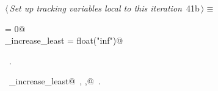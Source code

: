 \documentclass[11.5pt]{report}
\begin{document}
\begin{flushleft} \small\label{scrap57}\raggedright\small
{} $\langle\,${\itshape Set up tracking variables local to this iteration}\nobreak\ {\footnotesize {41b}}$\,\rangle\equiv$
\vspace{-1ex}
\begin{list}{}{} \item
\mbox{}\verb@ibest                = 0@\\
\mbox{}\verb@delta_increase_least = float("inf")@\\
\mbox{}\verb@@{\NWsep}
\end{list}
\vspace{-1.5ex}
\footnotesize
\begin{list}{}{\setlength{\itemsep}{-\parsep}\setlength{\itemindent}{-\leftmargin}}
\item \NWtxtMacroRefIn\ .
\item \NWtxtIdentsDefed\nobreak\  \verb@delta_increase_least@\nobreak\ , \verb@ibest,@\nobreak\ .
\item{}
\end{list}
\vspace{4ex}
\end{flushleft}

\vspace{-0.8cm}\newchunk 
\end{document}
